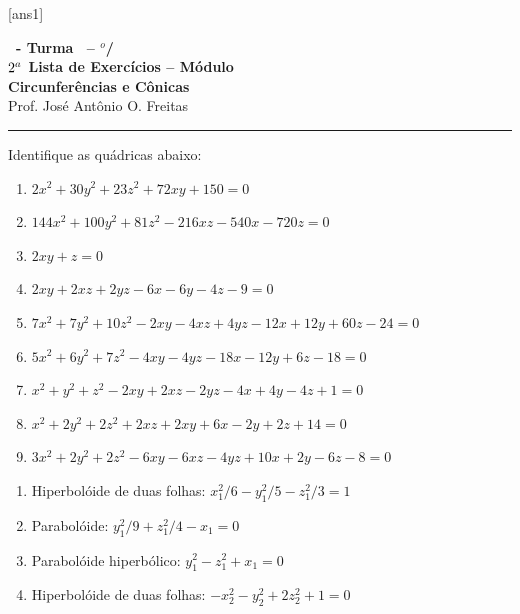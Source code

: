 \documentclass[12pt]{exam}
\begin{document}
    [ans1]

    \begin{center}
        {\Large\bf \disciplina\ - Turma \turma\ -- \semestre$^{o}$/\ano} \\ \vspace{9pt} {\large\bf
            $2^a$ Lista de Exercícios -- Módulo \numeromodulo\\ Circunferências e Cônicas}\\ \vspace{9pt} Prof. José Antônio O. Freitas
    \end{center}

    \hrule

    \vspace{.6cm}

\begin{exercicio}
    Identifique as qu\'adricas abaixo:
    \begin{enumerate}[label=({\alph*})]
        \item $2x^2 + 30y^2 + 23z^2 + 72xy + 150 = 0$
        \item $144x^2 + 100y^2 + 81z^2 - 216 xz - 540x - 720z = 0$
        \item $2xy + z = 0$
        \item $2xy + 2xz + 2yz - 6x - 6y - 4z - 9 = 0$
        \item $7x^2 + 7y^2 + 10z^2 - 2xy - 4xz + 4yz - 12x + 12y + 60z - 24 = 0$
        \item $5x^2 + 6y^2 + 7z^2 - 4xy - 4yz - 18x - 12y + 6z - 18 = 0$
        \item $x^2 + y^2 + z^2 - 2xy + 2xz - 2yz - 4x + 4y - 4z + 1 = 0$
        \item $x^2 + 2y^2 + 2z^2 + 2xz + 2xy + 6x - 2y + 2z + 14 = 0$
        \item $3x^2 + 2y^2 + 2z^2 - 6xy - 6xz - 4yz + 10x + 2y - 6z - 8 = 0$
    \end{enumerate}
    \begin{solucao}
        \begin{enumerate}[label=({\alph*})]
            \item Hiperbol\'oide de duas folhas: $x_1^2/6 - y_1^2/5 - z_1^2/3 = 1$
            \item Parabol\'oide: $y_1^2/9 + z_1^2/4 - x_1 = 0$
            \item Parabol\'oide hiperb\'olico: $y_1^2 - z_1^2 + x_1 = 0$
            \item Hiperbol\'oide de duas folhas: $-x_2^2 - y_2^2 + 2z_2^2 + 1 = 0$

\end{enumerate}
\end{solucao}
\end{exercicio}
\end{document}
